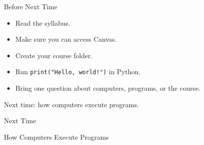 \documentclass[aspectratio=169]{beamer}
\begin{document}
\begin{frame}{Before Next Time}
  \begin{itemize}
    \item Read the syllabus.
    \item Make sure you can access Canvas.
    \item Create your course folder.
    \item Run \texttt{print("Hello, world!")} in Python.
    \item Bring one question about computers, programs, or the course.
  \end{itemize}
  \vspace{0.18in}
  \begin{keyidea}
    Next time: how computers execute programs.
  \end{keyidea}
\end{frame}

\begin{frame}{Next Time}
  \begin{center}
    {\Huge How Computers Execute Programs}
  \end{center}
\end{frame}
\end{document}
